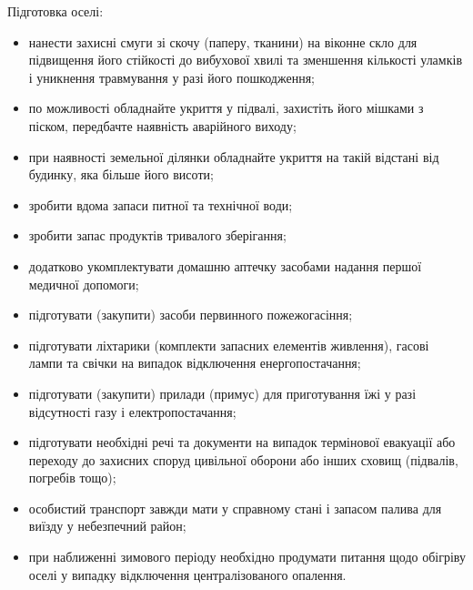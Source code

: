 Підготовка оселі:
\begin{itemize}	
	\item нанести захисні смуги зі скочу (паперу, тканини) на віконне скло для підвищення його стійкості до вибухової хвилі та зменшення кількості уламків і уникнення травмування у разі його пошкодження;
	\item по можливості обладнайте укриття у підвалі, захистіть його мішками з піском, передбачте наявність аварійного виходу;
	\item при наявності земельної ділянки обладнайте укриття на такій відстані від будинку, яка  більше його висоти;
	\item зробити вдома запаси питної та технічної води;
	\item зробити запас продуктів тривалого зберігання;
	\item додатково укомплектувати домашню аптечку засобами надання першої медичної допомоги;
	\item підготувати (закупити) засоби первинного пожежогасіння;
	\item підготувати ліхтарики (комплекти запасних елементів живлення), гасові лампи та свічки на випадок відключення енергопостачання;
	\item підготувати (закупити)  прилади (примус) для приготування їжі у разі відсутності газу і електропостачання;
	\item підготувати необхідні речі та документи на випадок термінової евакуації або переходу до захисних споруд цивільної оборони або інших сховищ (підвалів, погребів тощо);
	\item особистий транспорт завжди мати у справному стані і запасом палива для виїзду у небезпечний район;
	\item при наближенні зимового періоду необхідно продумати питання щодо обігріву оселі у випадку відключення централізованого опалення.
\end{itemize}

